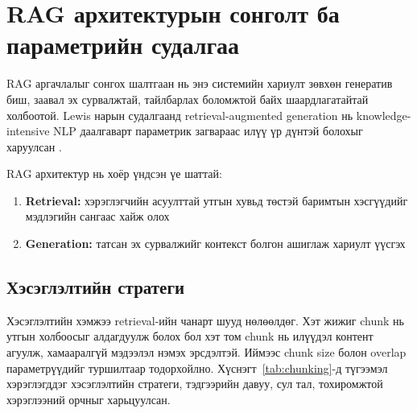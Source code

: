 
\section{RAG архитектурын сонголт ба параметрийн судалгаа}

RAG аргачлалыг сонгох шалтгаан нь энэ системийн хариулт зөвхөн генератив биш, заавал эх сурвалжтай, тайлбарлах боломжтой байх шаардлагатайтай холбоотой. Lewis нарын судалгаанд retrieval-augmented generation нь knowledge-intensive NLP даалгаварт параметрик загвараас илүү үр дүнтэй болохыг харуулсан \cite{rag_survey}.

RAG архитектур нь хоёр үндсэн үе шаттай:
\begin{enumerate}
    \item \textbf{Retrieval:} хэрэглэгчийн асуулттай утгын хувьд төстэй баримтын хэсгүүдийг мэдлэгийн сангаас хайж олох
    \item \textbf{Generation:} татсан эх сурвалжийг контекст болгон ашиглаж хариулт үүсгэх
\end{enumerate}

\subsection{Хэсэглэлтийн стратеги}

Хэсэглэлтийн хэмжээ retrieval-ийн чанарт шууд нөлөөлдөг. Хэт жижиг chunk нь утгын холбоосыг алдагдуулж болох бол хэт том chunk нь илүүдэл контент агуулж, хамааралгүй мэдээлэл нэмэх эрсдэлтэй. Иймээс chunk size болон overlap параметрүүдийг туршилтаар тодорхойлно. Хүснэгт~\ref{tab:chunking}-д түгээмэл хэрэглэгддэг хэсэглэлтийн стратеги, тэдгээрийн давуу, сул тал, тохиромжтой хэрэглээний орчныг харьцуулсан.

